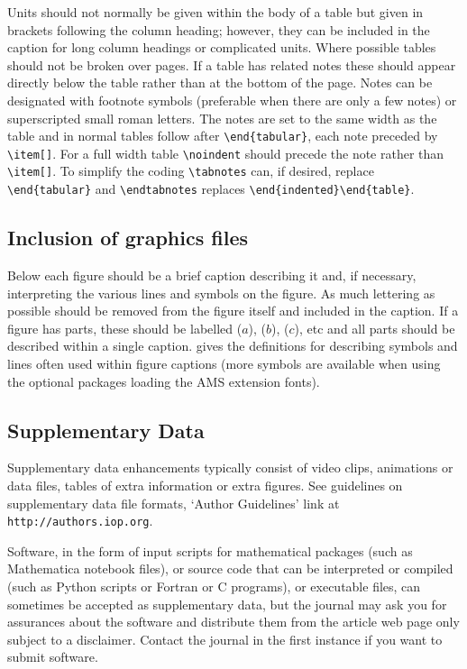 Units should not normally be given within the body of a table but
given in brackets following the column heading; however, they can be
included in the caption for long column headings or complicated units.
Where possible tables should not be broken over pages.
If a table has related notes these should appear directly below the table
rather than at the bottom of the page. Notes can be designated with
footnote symbols (preferable when there are only a few notes) or
superscripted small roman letters. The notes are set to the same width as
the table and in normal tables follow after \verb"\end{tabular}", each
note preceded by \verb"\item[]". For a full width table \verb"\noindent"
should precede the note rather than \verb"\item[]". To simplify the coding
\verb"\tabnotes" can, if desired, replace \verb"\end{tabular}" and
\verb"\endtabnotes" replaces
\verb"\end{indented}\end{table}".

\subsection{Inclusion of graphics files\label{figinc}}

Below each figure should be a brief caption describing it and, if
necessary, interpreting the various lines and symbols on the figure.
As much lettering as possible should be removed from the figure itself
and included in the caption. If a figure has parts, these should be
labelled ($a$), ($b$), ($c$), etc and all parts should be described
within a single caption.  gives the definitions for describing
symbols and lines often used within figure captions (more symbols are
available when using the optional packages loading the AMS extension fonts).

\subsection{Supplementary Data}

Supplementary data
enhancements typically consist of video clips, animations or
data files, tables of extra information or extra figures. See
guidelines on supplementary data file formats,
`Author Guidelines' link at \verb"http://authors.iop.org".

Software, in the form of input scripts for mathematical packages (such as
Mathematica notebook files), or source code that can be interpreted or
compiled (such as Python scripts or Fortran or C programs), or executable
files, can sometimes be accepted as supplementary data, but the journal
may ask you for assurances about the software and distribute them from
the article web page only subject to a disclaimer.  Contact the journal
in the first instance if you want to submit software.

